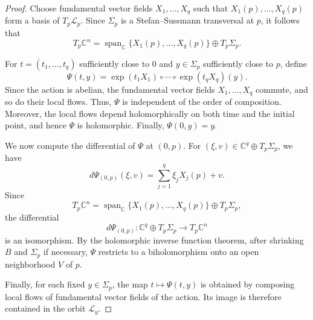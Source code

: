 \documentclass[11pt]{amsart}
\theoremstyle{definition}
\theoremstyle{remark}
\newcommand{\C}{\mathbb{C}}
\newcommand{\leaf}[1]{\mathcal{L}_{#1}}
\begin{document}
\begin{proof}
	Choose fundamental vector fields $X_1,\ldots,X_q$ such that $X_1(p),\ldots,X_q(p)$ form a basis of $T_p\leaf{p}$. 
	Since $\Sigma_p$ is a Stefan--Sussmann transversal at $p$, it follows that
	\[
    		T_p\C^n =  \operatorname{span}_{\C}\{X_1(p),\ldots,X_q(p)\} \oplus T_p\Sigma_p.
	\]

	For $t=(t_1,\ldots,t_q)$ sufficiently close to $0$ and $y\in\Sigma_p$ sufficiently close to $p$, define 
	$$ 
		\Psi(t,y) = \exp(t_1X_1)\circ\cdots\circ\exp(t_qX_q)(y).
	$$
	Since the action is abelian, the fundamental vector fields $X_1,\ldots,X_q$ commute, and so do their local flows. Thus, $\Psi$ is independent of the order of composition. Moreover, the local flows depend holomorphically on both time and the initial point, and hence $\Psi$ is holomorphic. Finally, $\Psi(0,y)=y.$

%
%
 
	We now compute the differential of $\Psi$ at $(0,p)$. For $(\xi,v)\in\C^q\oplus T_p\Sigma_p$, we have
	\[
		d\Psi_{(0,p)}(\xi,v) = \sum_{j=1}^q \xi_jX_j(p)+v.
	\]
	Since
	\[
		T_p\C^n = \operatorname{span}_{\C}\{X_1(p),\ldots,X_q(p)\} \oplus T_p\Sigma_p,
	\]
	the differential
	\[
    		d\Psi_{(0,p)}: \C^q\oplus T_p\Sigma_p \longrightarrow T_p\C^n
	\]
	is an isomorphism. By the holomorphic inverse function theorem, after shrinking $B$ and $\Sigma_p$ if necessary, $\Psi$ restricts to a biholomorphism onto an open neighborhood $V$ of $p$.

	Finally, for each fixed $y\in\Sigma_p$, the map $t\longmapsto\Psi(t,y)$ is obtained by composing local flows of fundamental vector fields of the action. Its image is therefore contained in the orbit $\leaf{y}$. 
\end{proof}
\end{document}
